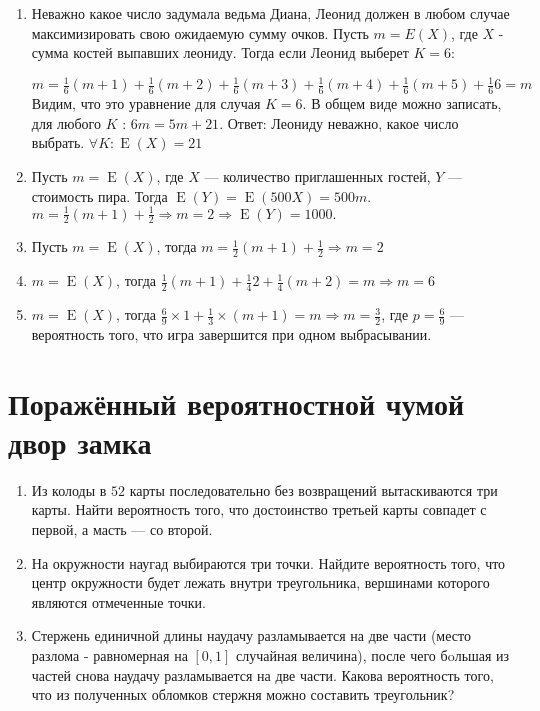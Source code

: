 \documentclass[a4paper,12pt]{article}
\DeclareMathOperator{\E}{E}
\begin{document}
\begin{enumerate}
\item Неважно какое число задумала ведьма Диана, Леонид должен в любом случае максимизировать свою ожидаемую сумму очков. Пусть $m = E(X)$, где $X$ - сумма костей выпавших леониду. Тогда если Леонид выберет $K = 6$:

$m =\frac{1}{6}(m+1) + \frac{1}{6}(m+2) + \frac{1}{6}(m+3) + \frac{1}{6}(m+4) + \frac{1}{6}(m+5) + \frac{1}{6} 6 = m$ Видим, что это уравнение для случая $K = 6$. В общем виде можно записать, для любого $K$ : $6m = 5m + 21$. Ответ: Леониду неважно, какое число выбрать. $\forall K:  \E(X) = 21$
\item Пусть $m = \E(X)$, где $X$ — количество приглашенных гостей, $Y$ — стоимость пира. Тогда $\E(Y) = \E(500  X) = 500 m$. $m = \frac{1}{2}(m+1) + \frac{1}{2} \Rightarrow m = 2 \Rightarrow \E(Y) = 1000.$
\item Пусть $m = \E(X)$, тогда $m = \frac{1}{2}(m+1) + \frac{1}{2} \Rightarrow m = 2$
\item $m = \E(X)$, тогда $\frac{1}{2}(m+1) + \frac{1}{4} 2 + \frac{1}{4}(m+2)=m \Rightarrow m = 6$
\item $m = \E(X)$, тогда $\frac{6}{9} \times 1 + \frac{1}{3} \times (m+1) = m \Rightarrow m = \frac{3}{2}$, где $p = \frac{6}{9}$  — вероятность того, что игра завершится при одном выбрасывании.
\end{enumerate}




\newpage
\section{Поражённый вероятностной чумой двор замка}

\begin{enumerate}
\item %

Из колоды в $52$ карты последовательно без возвращений вытаскиваются три карты. Найти вероятность того, что достоинство третьей карты совпадет с первой, а масть — со второй.

\item %

На окружности наугад выбираются три точки. Найдите вероятность того, что центр окружности будет лежать внутри треугольника, вершинами которого являются отмеченные точки.

\item

Стержень единичной длины наудачу разламывается на две части (место разлома - равномерная на $[0,1]$ случайная величина), после чего бoльшая из частей снова наудачу разламывается на две части. Какова вероятность того, что из полученных обломков стержня можно составить треугольник?
\end{enumerate}
\end{document}
